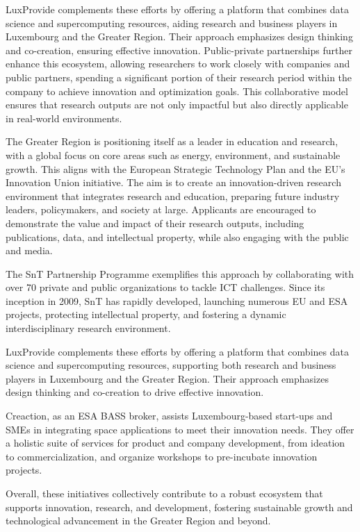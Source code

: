 \documentclass{article}
\begin{document}
LuxProvide complements these efforts by offering a platform that combines data science and supercomputing resources, aiding research and business players in Luxembourg and the Greater Region. Their approach emphasizes design thinking and co-creation, ensuring effective innovation. Public-private partnerships further enhance this ecosystem, allowing researchers to work closely with companies and public partners, spending a significant portion of their research period within the company to achieve innovation and optimization goals. This collaborative model ensures that research outputs are not only impactful but also directly applicable in real-world environments.

The Greater Region is positioning itself as a leader in education and research, with a global focus on core areas such as energy, environment, and sustainable growth. This aligns with the European Strategic Technology Plan and the EU's Innovation Union initiative. The aim is to create an innovation-driven research environment that integrates research and education, preparing future industry leaders, policymakers, and society at large. Applicants are encouraged to demonstrate the value and impact of their research outputs, including publications, data, and intellectual property, while also engaging with the public and media.

The SnT Partnership Programme exemplifies this approach by collaborating with over 70 private and public organizations to tackle ICT challenges. Since its inception in 2009, SnT has rapidly developed, launching numerous EU and ESA projects, protecting intellectual property, and fostering a dynamic interdisciplinary research environment.

LuxProvide complements these efforts by offering a platform that combines data science and supercomputing resources, supporting both research and business players in Luxembourg and the Greater Region. Their approach emphasizes design thinking and co-creation to drive effective innovation.

Creaction, as an ESA BASS broker, assists Luxembourg-based start-ups and SMEs in integrating space applications to meet their innovation needs. They offer a holistic suite of services for product and company development, from ideation to commercialization, and organize workshops to pre-incubate innovation projects.

Overall, these initiatives collectively contribute to a robust ecosystem that supports innovation, research, and development, fostering sustainable growth and technological advancement in the Greater Region and beyond.
\end{document}
